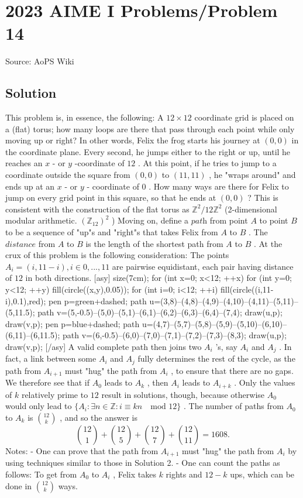 \documentclass[12pt]{article}
\begin{document}
\section*{{2023 AIME I Problems/Problem 14}}
Source: AoPS Wiki

\subsection*{Solution}
This problem is, in essence, the following: A $12\times12$ coordinate grid is placed on a (flat) torus; how many loops are there that pass through each point while only moving up or right? In other words, Felix the frog starts his journey at $(0,0)$ in the coordinate plane. Every second, he jumps either to the right or up, until he reaches an $x$ - or $y$ -coordinate of $12$ . At this point, if he tries to jump to a coordinate outside the square from $(0,0)$ to $(11,11)$ , he "wraps around" and ends up at an $x$ - or $y$ - coordinate of $0$ . How many ways are there for Felix to jump on every grid point in this square, so that he ends at $(0,0)$ ? This is consistent with the construction of the flat torus as $\mathbb Z^2/12\mathbb Z^2$ (2-dimensional modular arithmetic. $(\mathbb{Z}_{12})^2$ ) Moving on, define a $\textit{path}$ from point $A$ to point $B$ to be a sequence of "up"s and "right"s that takes Felix from $A$ to $B$ . The $\textit{distance}$ from $A$ to $B$ is the length of the shortest path from $A$ to $B$ . At the crux of this problem is the following consideration: The points $A_i=(i,11-i), i\in{0,...,11}$ are pairwise equidistant, each pair having distance of $12$ in both directions. [asy] size(7cm); for (int x=0; x<12; ++x){ for (int y=0; y<12; ++y){ fill(circle((x,y),0.05));}} for (int i=0; i<12; ++i){ fill(circle((i,11-i),0.1),red);} pen p=green+dashed; path u=(3,8)--(4,8)--(4,9)--(4,10)--(4,11)--(5,11)--(5,11.5); path v=(5,-0.5)--(5,0)--(5,1)--(6,1)--(6,2)--(6,3)--(6,4)--(7,4); draw(u,p); draw(v,p); pen p=blue+dashed; path u=(4,7)--(5,7)--(5,8)--(5,9)--(5,10)--(6,10)--(6,11)--(6,11.5); path v=(6,-0.5)--(6,0)--(7,0)--(7,1)--(7,2)--(7,3)--(8,3); draw(u,p); draw(v,p); [/asy] A valid complete path then joins two $A_i$ 's, say $A_i$ and $A_j$ . In fact, a link between some $A_i$ and $A_j$ fully determines the rest of the cycle, as the path from $A_{i+1}$ must "hug" the path from $A_i$ , to ensure that there are no gaps. We therefore see that if $A_0$ leads to $A_k$ , then $A_i$ leads to $A_{i+k}$ . Only the values of $k$ relatively prime to $12$ result in solutions, though, because otherwise $A_0$ would only lead to $\{A_i:\exists n\in \mathbb Z:i\equiv kn\quad\text{mod 12}\}$ . The number of paths from $A_0$ to $A_k$ is ${12\choose k}$ , and so the answer is \[{12\choose1}+{12\choose5}+{12\choose7}+{12\choose11}=1\boxed{608}.\] Notes: - One can prove that the path from $A_{i+1}$ must "hug" the path from $A_i$ by using techniques similar to those in Solution 2. - One can count the paths as follows: To get from $A_0$ to $A_i$ , Felix takes $k$ rights and $12-k$ ups, which can be done in ${12\choose k}$ ways.
\end{document}
